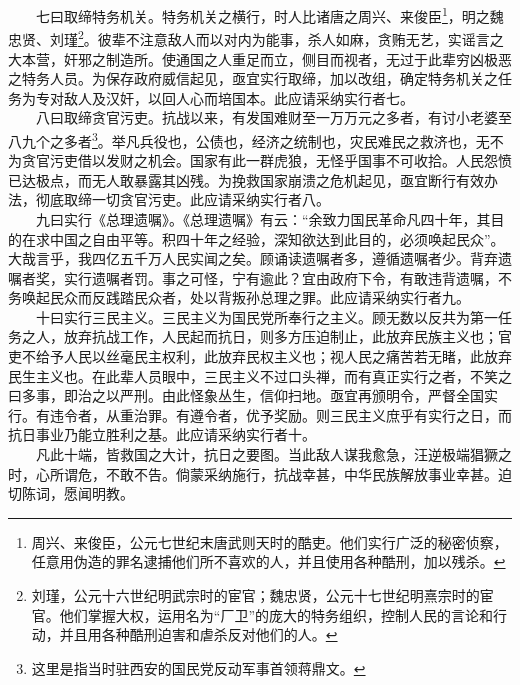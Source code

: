 \documentclass[cn,11pt,chinese]{elegantbook}
\begin{document}
　　七曰取缔特务机关。特务机关之横行，时人比诸唐之周兴、来俊臣\footnote[6]{ 周兴、来俊臣，公元七世纪末唐武则天时的酷吏。他们实行广泛的秘密侦察，任意用伪造的罪名逮捕他们所不喜欢的人，并且使用各种酷刑，加以残杀。}，明之魏忠贤、刘瑾\footnote[7]{ 刘瑾，公元十六世纪明武宗时的宦官；魏忠贤，公元十七世纪明熹宗时的宦官。他们掌握大权，运用名为“厂卫”的庞大的特务组织，控制人民的言论和行动，并且用各种酷刑迫害和虐杀反对他们的人。}。彼辈不注意敌人而以对内为能事，杀人如麻，贪贿无艺，实谣言之大本营，奸邪之制造所。使通国之人重足而立，侧目而视者，无过于此辈穷凶极恶之特务人员。为保存政府威信起见，亟宜实行取缔，加以改组，确定特务机关之任务为专对敌人及汉奸，以回人心而培国本。此应请采纳实行者七。\\
　　八曰取缔贪官污吏。抗战以来，有发国难财至一万万元之多者，有讨小老婆至八九个之多者\footnote[8]{ 这里是指当时驻西安的国民党反动军事首领蒋鼎文。}。举凡兵役也，公债也，经济之统制也，灾民难民之救济也，无不为贪官污吏借以发财之机会。国家有此一群虎狼，无怪乎国事不可收拾。人民怨愤已达极点，而无人敢暴露其凶残。为挽救国家崩溃之危机起见，亟宜断行有效办法，彻底取缔一切贪官污吏。此应请采纳实行者八。\\
　　九曰实行《总理遗嘱》。《总理遗嘱》有云：“余致力国民革命凡四十年，其目的在求中国之自由平等。积四十年之经验，深知欲达到此目的，必须唤起民众”。大哉言乎，我四亿五千万人民实闻之矣。顾诵读遗嘱者多，遵循遗嘱者少。背弃遗嘱者奖，实行遗嘱者罚。事之可怪，宁有逾此？宜由政府下令，有敢违背遗嘱，不务唤起民众而反践踏民众者，处以背叛孙总理之罪。此应请采纳实行者九。\\
　　十曰实行三民主义。三民主义为国民党所奉行之主义。顾无数以反共为第一任务之人，放弃抗战工作，人民起而抗日，则多方压迫制止，此放弃民族主义也；官吏不给予人民以丝毫民主权利，此放弃民权主义也；视人民之痛苦若无睹，此放弃民生主义也。在此辈人员眼中，三民主义不过口头禅，而有真正实行之者，不笑之曰多事，即治之以严刑。由此怪象丛生，信仰扫地。亟宜再颁明令，严督全国实行。有违令者，从重治罪。有遵令者，优予奖励。则三民主义庶乎有实行之日，而抗日事业乃能立胜利之基。此应请采纳实行者十。\\
　　凡此十端，皆救国之大计，抗日之要图。当此敌人谋我愈急，汪逆极端猖獗之时，心所谓危，不敢不告。倘蒙采纳施行，抗战幸甚，中华民族解放事业幸甚。迫切陈词，愿闻明教。\\
\newpage
\end{document}
